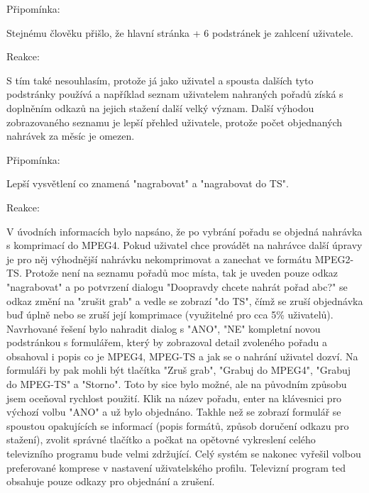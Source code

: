 \vspace{10pt}

\begin{bf}Připomínka:\end{bf} Stejnému člověku přišlo, že hlavní stránka + 6 podstránek je zahlcení uživatele. 

\begin{bf}Reakce:\end{bf} S tím také nesouhlasím, protože já jako uživatel a spousta dalších tyto podstránky používá a například seznam uživatelem nahraných pořadů získá s doplněním odkazů na jejich stažení další velký význam. Další výhodou zobrazovaného seznamu je lepší přehled uživatele, protože počet objednaných nahrávek za měsíc je omezen.

\vspace{10pt}

\begin{bf}Připomínka:\end{bf} Lepší vysvětlení co znamená "nagrabovat" a "nagrabovat do TS". 

\begin{bf}Reakce:\end{bf} V úvodních informacích bylo napsáno, že po vybrání pořadu se objedná nahrávka s komprimací do MPEG4. Pokud uživatel chce provádět na nahrávce další úpravy je pro něj výhodnější nahrávku nekomprimovat a zanechat ve formátu MPEG2-TS. Protože není na seznamu pořadů moc místa, tak je uveden pouze odkaz "nagrabovat" a po potvrzení dialogu "Doopravdy chcete nahrát pořad abc?" se odkaz změní na "zrušit grab" a vedle se zobrazí "do TS", čímž se zruší objednávka buď úplně nebo se zruší její komprimace (využitelné pro cca 5\% uživatelů). Navrhované řešení bylo nahradit dialog s "ANO", "NE" kompletní novou podstránkou s formulářem, který by zobrazoval detail zvoleného pořadu a obsahoval i popis co je MPEG4, MPEG-TS a jak se o nahrání uživatel dozví. Na formuláři by pak mohli být tlačítka "Zruš grab", "Grabuj do MPEG4", "Grabuj do MPEG-TS" a "Storno". Toto by sice bylo možné, ale na původním způsobu jsem oceňoval rychlost použití. Klik na název pořadu, enter na klávesnici pro výchozí volbu "ANO" a už bylo objednáno. Takhle než se zobrazí formulář se spoustou opakujících se informací (popis formátů, způsob doručení odkazu pro stažení), zvolit správné tlačítko a počkat na opětovné vykreslení celého televizního programu bude velmi zdržující. Celý systém se nakonec vyřešil volbou preferované komprese v nastavení uživatelského profilu. Televizní program ted obsahuje pouze odkazy pro objednání a zrušení.

